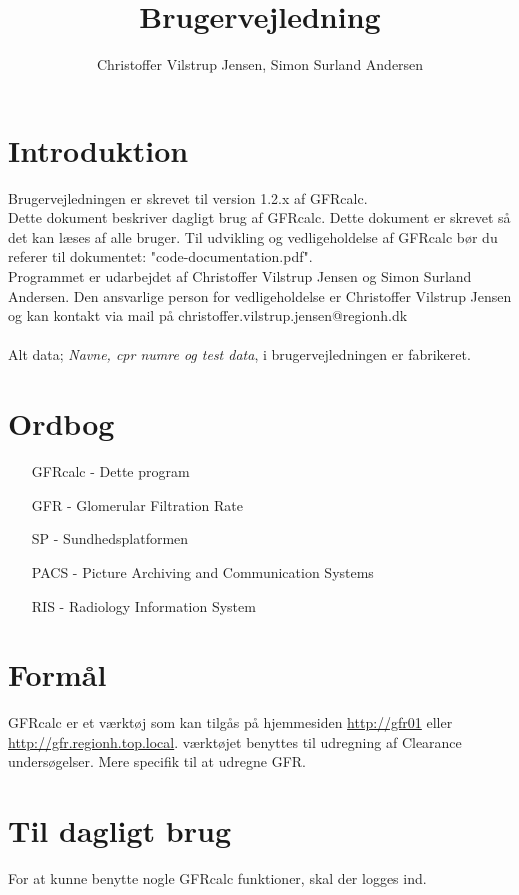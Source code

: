 \documentclass{article}
\author{Christoffer Vilstrup Jensen, Simon Surland Andersen}
\title{Brugervejledning}
\begin{document}
\tableofcontents
\section*{Introduktion}
Brugervejledningen er skrevet til version 1.2.x af GFRcalc.\\

Dette dokument beskriver dagligt brug af GFRcalc. Dette dokument er skrevet så det kan læses af alle bruger. Til udvikling og vedligeholdelse af GFRcalc bør du referer til dokumentet: "code-documentation.pdf".\\

Programmet er udarbejdet af Christoffer Vilstrup Jensen og Simon Surland Andersen. Den ansvarlige person for vedligeholdelse er Christoffer Vilstrup Jensen og kan kontakt via mail på christoffer.vilstrup.jensen@regionh.dk\\\\
Alt data; \textit{Navne, cpr numre og test data}, i brugervejledningen er fabrikeret.

\section*{Ordbog}
\begin{itemize}
	\item[GFRcalc] 	- Dette program
	\item[GFR]     	- Glomerular Filtration Rate
	\item[SP]      	- Sundhedsplatformen
	\item[PACS]	   	- Picture Archiving and Communication Systems
	\item[RIS]		- Radiology Information System
\end{itemize}
\section*{Formål}
GFRcalc er et værktøj som kan tilgås på hjemmesiden \url{http://gfr01} eller \url{http://gfr.regionh.top.local}. værktøjet benyttes til udregning af Clearance undersøgelser. Mere specifik til at udregne GFR. 
\newpage
\section{Til dagligt brug}
For at kunne benytte nogle GFRcalc funktioner, skal der logges ind.
\end{document}
